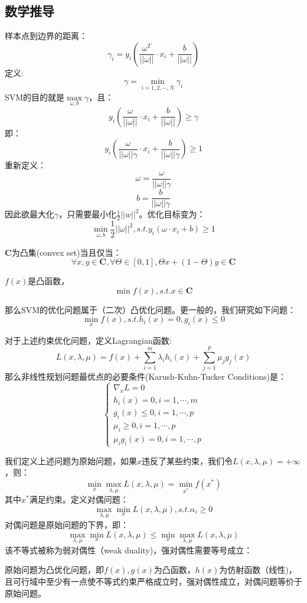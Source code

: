 \documentclass[cn,hazy,blue,normal,14pt]{elegantnote}
\begin{document}
\subsection{数学推导}
样本点到边界的距离：
$$
\gamma_i=y_i (\frac{\omega^T}{||\omega||}\cdot x_i+\frac{b}{||\omega||})
$$
定义:
$$
\gamma=\min_{i=1,2,\cdots,N}\gamma_i
$$
SVM的目的就是$\max\limits_{\omega,b} \gamma$，且：
$$
y_i (\frac{\omega}{||\omega||}\cdot x_i+\frac{b}{||\omega||})\geqslant \gamma
$$
即：
$$
y_i (\frac{\omega}{||\omega||\gamma}\cdot x_i+\frac{b}{||\omega||\gamma})\geqslant 1
$$
重新定义：
$$
\omega=\frac{\omega}{||\omega||\gamma}
$$
$$
b=\frac{b}{||\omega||\gamma}
$$
因此欲最大化$\gamma$，只需要最小化$\frac{1}{2}||w||^2$。优化目标变为：
$$
\min_{\omega,b}\frac{1}{2}||\omega||^2,s.t.y_i(\omega\cdot x_i+b)\geqslant 1
$$
\begin{definition}[凸集]
$\mathbf{C}$为凸集(convex set)当且仅当：
$$
\forall x,y \in \mathbf{C},\forall \Theta \in [0,1],\Theta x+(1-\Theta)y \in \mathbf{C}
$$
\end{definition}
\begin{definition}[凸优化问题]
$f(x)$是凸函数，
$$
\min f(x),s.t. x\in \mathbf{C}
$$
\end{definition}
那么SVM的优化问题属于（二次）凸优化问题。更一般的，我们研究如下问题：
$$
\min_x f(x),s.t.h_i(x)=0,g_i(x)\leqslant 0
$$      
\begin{theorem}[KKT条件]
对于上述约束优化问题，定义Lagrangian函数:
$$
L(x,\lambda,\mu)=f(x)+\sum_{i=1}^m \lambda_i h_i(x)+\sum_{j=1}^p \mu_j g_j(x)
$$
那么非线性规划问题最优点的必要条件(Karush-Kuhn-Tucker Conditions)是：
$$
\begin{cases}
\nabla_x L=0 \\
h_i(x)=0,i=1,\cdots,m \\
g_i(x)\leqslant 0,i=1,\cdots,p \\
\mu_i \geqslant 0,i=1,\cdots,p \\
\mu_i g_i(x)=0,i=1,\cdots,p
\end{cases}
$$
\end{theorem}
我们定义上述问题为原始问题，如果$x$违反了某些约束，我们令$L(x,\lambda,\mu)=+\infty$，则：
$$
\min_x \max_{\lambda,\mu} L(x,\lambda,\mu)=\min_{x^*} f(x^*)
$$
其中$x^*$满足约束。定义对偶问题：
$$
\max_{\lambda,\mu} \min_x L(x,\lambda,\mu),s.t. \alpha_i \geqslant 0
$$
对偶问题是原始问题的下界，即：
$$
\max_{\lambda,\mu} \min_x L(x,\lambda,\mu) \leqslant \min_x \max_{\lambda,\mu} L(x,\lambda,\mu)
$$
该不等式被称为弱对偶性（weak duality)，强对偶性需要等号成立：
\begin{theorem}[slater条件]
原始问题为凸优化问题，即$f(x),g(x)$为凸函数，$h(x)$为仿射函数（线性)，且可行域中至少有一点使不等式约束严格成立时，强对偶性成立，对偶问题等价于原始问题。
\end{theorem}
\end{document}
